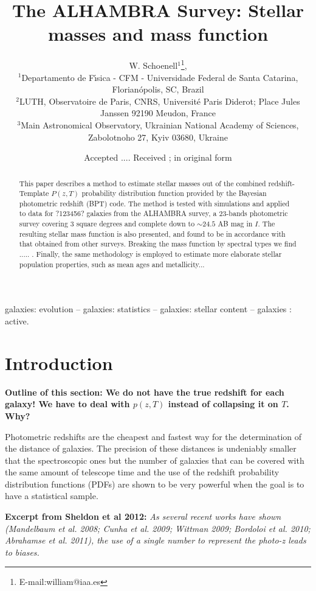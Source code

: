 \documentclass[a4paper, useAMS, usenatbib, hyperpdf]{mn2e}
\title[The ALHAMBRA Survey: Stellar masses]
{The ALHAMBRA Survey: Stellar masses and mass function}
\author[Schoenell et al.] {
	  W. Schoenell$^{1}$\thanks{E-mail:william@iaa.es}, \\
          $^{1}$Departamento de F\'{\i}sica - CFM - Universidade Federal de Santa Catarina, Florian\'opolis, SC, Brazil\\
          $^{2}$LUTH, Observatoire de Paris, CNRS, Universit\'e Paris Diderot; Place Jules Janssen 92190 Meudon, France\\
          $^{3}$Main Astronomical Observatory, Ukrainian National Academy of Sciences, Zabolotnoho 27, Kyiv 03680,  Ukraine\\
	}
\def\ojo{\fbox{\bf !$\odot$j$\odot$!}} %
\begin{document}
\date{Accepted .... Received ; in original form }

\pagerange{\pageref{firstpage}--\pageref{lastpage}} 

\maketitle

\label{firstpage}

\begin{abstract} 
This paper describes a method to estimate stellar masses out of the combined redshift-Template $P(z,T)$ probability distribution function provided by the Bayesian photometric redshift (BPT) code. The method is tested with simulations and applied to data for ?123456? galaxies from the ALHAMBRA survey, a 23-bands photometric survey covering 3 square degrees and complete down to $\sim 24.5$ AB mag in $I$. The resulting stellar mass function is also presented, and found to be in accordance with that obtained from other surveys. Breaking the mass function by spectral types we find ..... \ojo .
Finally, the same methodology is employed to estimate more elaborate stellar population properties, such as mean ages and metallicity...\ojo
\end{abstract}

\begin{keywords}
galaxies:  evolution -- galaxies: statistics -- galaxies: stellar content -- galaxies : active.
\end{keywords}


\section{Introduction}
\label{sec:intro}
{\bf \color{red} Outline of this section: We do not have the true redshift for each galaxy! We have to deal with $p(z,T)$ instead of collapsing it on $T$. Why?}

Photometric redshifts are the cheapest and fastest way for the determination of the distance of galaxies. The precision of these distances is undeniably smaller that the spectroscopic ones but the number of galaxies that can be covered with the same amount of telescope time and the use of the redshift probability distribution functions (PDFs) are shown to be very powerful when the goal is to have a statistical sample.

{{\bf Excerpt from Sheldon et al 2012:} \it As several recent works have shown (Mandelbaum et al. 2008; Cunha et al. 2009; Wittman 2009; Bordoloi et al. 2010; Abrahamse et al. 2011), the use of a single number to represent the photo-z leads to biases. }
\end{document}
